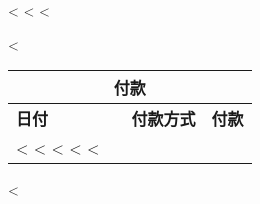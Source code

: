 \begin{CJK}{UTF8}{arialuni}
<%
\vspace{0.3cm}
<%
<%

\vspace{1.5cm}

<%
\begin{tabular}{@{}lllr@{}}
  \multicolumn{4}{c}{\textbf{付款}} \\
  \hline
  \textbf{日付} & & \textbf{付款方式} & \textbf{付款} \\
<%
<%
  <%
<%
<%
\end{tabular}
<%

\vspace{0.5cm}
\vfill
\end{CJK}    


